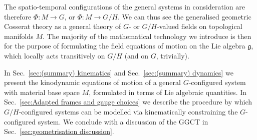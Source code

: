 The spatio-temporal configurations of the general systems in consideration are therefore $\Phi : M \to G$, or $\Phi : M \to G/H$. We can thus see the generalised geometric Cosserat theory as a general theory of $G$- or $G/H$-valued fields on topological manifolds $M$. The majority of the mathematical technology we introduce is then for the purpose of formulating the field equations of motion on the Lie algebra $\mathfrak{g}$, which locally acts transitively on $G/H$ (and on $G$, trivially).

In Sec.~\ref{sec:(summary) kinematics} and Sec.~\ref{sec:(summary) dynamics} we present the kinodynamic equations of motion of a general $G$-configured system with material base space $M$, formulated in terms of Lie algebraic quantities. In Sec.~\ref{sec:Adapted frames and gauge choices} we describe the procedure by which $G/H$-configured systems can be modelled via kinematically constraining the $G$-configured system. We conclude with a discussion of the GGCT in Sec.~\ref{sec:geometrisation discussion}.



